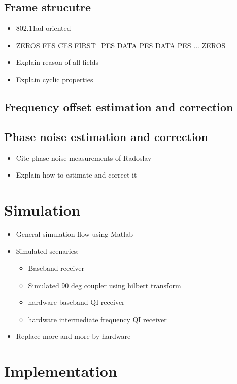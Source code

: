\section{Frame strucutre}
\begin{itemize}
\item 802.11ad oriented
\item ZEROS FES CES FIRST\_PES DATA PES DATA PES ... ZEROS
\item Explain reason of all fields
\item Explain cyclic properties
\end{itemize}

\section{Frequency offset estimation and correction}

\section{Phase noise estimation and correction}
\begin{itemize}
\item Cite phase noise measurements of Radoslav
\item Explain how to estimate and correct it
\end{itemize}

\chapter{Simulation}
\begin{itemize}
\item General simulation flow using Matlab
\item Simulated scenaries:
  \begin{itemize}
  \item Baseband receiver
  \item Simulated 90 deg coupler using hilbert transform
  \item hardware baseband QI receiver
  \item hardware intermediate frequency QI receiver
  \end{itemize}
\item Replace more and more by hardware
\end{itemize}

\chapter{Implementation}
